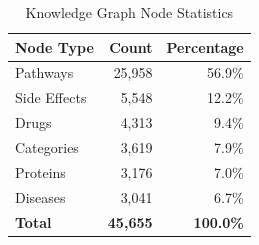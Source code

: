\begin{table}[htbp]
\centering
\caption{Knowledge Graph Node Statistics}
\label{tab:kg_nodes}
\begin{tabular}{lrr}
\toprule
\textbf{Node Type} & \textbf{Count} & \textbf{Percentage} \\
\midrule
Pathways & 25,958 & 56.9\% \\
Side Effects & 5,548 & 12.2\% \\
Drugs & 4,313 & 9.4\% \\
Categories & 3,619 & 7.9\% \\
Proteins & 3,176 & 7.0\% \\
Diseases & 3,041 & 6.7\% \\
\midrule
\textbf{Total} & \textbf{45,655} & \textbf{100.0\%} \\
\bottomrule
\end{tabular}
\end{table}
